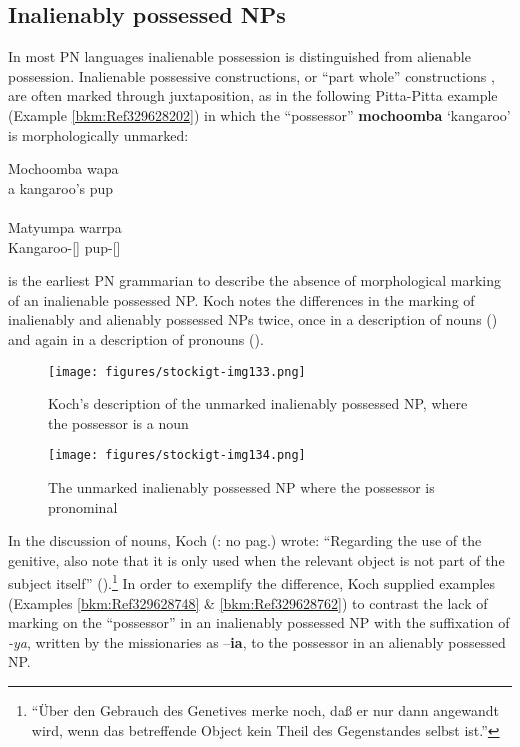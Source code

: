 \subsection{Inalienably possessed NPs}
\label{sec:key:8.7.2}\label{bkm:Ref456086200}

In most PN languages inalienable possession is distinguished from alienable possession. Inalienable possessive constructions, or “part whole” constructions \citep[59]{dixon_preface_2002}, are often marked through juxtaposition, as in the following Pitta-Pitta example (Example \ref{bkm:Ref329628202}) in which the “possessor” \textbf{mochoomba} `kangaroo' is morphologically unmarked:

\ea\label{bkm:Ref329628202}
\gll Mochoomba wapa\\
{a kangaroo’s} pup \\
\glt \citep[8]{Roth1897} \\
\gll Matyumpa warrpa\\
Kangaroo-[]    pup-[]\\ 
\z

\citet{koch_untitled_1868} is the earliest PN grammarian to describe the absence of morphological marking of an inalienable possessed NP. Koch notes the differences in the marking of inalienably and alienably possessed NPs twice, once in a description of nouns () and again in a description of pronouns ().


\begin{figure}
\texttt{[image: figures/stockigt-img133.png]}
\caption{Koch’s description of the unmarked inalienably possessed NP, where the possessor is a noun \citeyearpar[no pag.]{koch_untitled_1868}}
\label{bkm:Ref449373839}\label{fig:key:8-184}
\end{figure}

\begin{figure}
\texttt{[image: figures/stockigt-img134.png]}
\caption{The unmarked inalienably possessed NP where the possessor is pronominal \citep[no pag.]{koch_untitled_1868}}
\label{bkm:Ref449373862}\label{fig:key:8-185}
\end{figure}

In the discussion of nouns, Koch (\citeyear{koch_untitled_1868}: no pag.) wrote: “Regarding the use of the genitive, also note that it is only used when the relevant object is not part of the subject itself” ().\footnote{``Über den Gebrauch des Genetives merke noch, daß er nur dann angewandt wird, wenn das betreffende Object kein Theil des Gegenstandes selbst ist.''} In order to exemplify the difference, Koch supplied examples (Examples \ref{bkm:Ref329628748} \& \ref{bkm:Ref329628762}) to contrast the lack of marking on the “possessor” in an inalienably possessed NP with the suffixation of \textit{-ya}, written by the missionaries as –\textbf{ia}, to the possessor in an alienably possessed NP.

